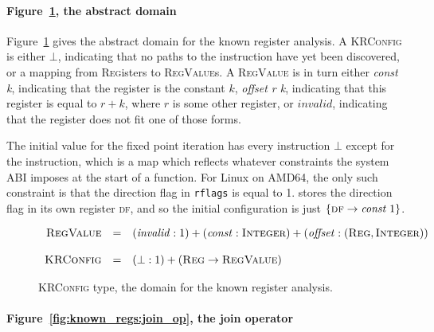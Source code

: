 
\paragraph{Figure~\ref{fig:known_regs:configuration}, the abstract domain}

Figure~\ref{fig:known_regs:configuration} gives the abstract domain
for the known register analysis.  A \textsc{KRConfig} is either
$\bot$, indicating that no paths to the instruction have yet been
discovered, or a mapping from \textsc{Reg}isters to
\textsc{RegValue}s.  A \textsc{RegValue} is in turn either
\textit{const k}, indicating that the register is the constant $k$,
\textit{offset r k}, indicating that this register is equal to $r +
k$, where $r$ is some other register, or $\mathit{invalid}$,
indicating that the register does not fit one of those forms.

The initial value for the fixed point iteration has every instruction
$\bot$ except for the  instruction, which is a
map which reflects whatever constraints the system ABI imposes at the
start of a function.  For Linux on AMD64, the only such constraint is
that the direction flag in \texttt{rflags} is equal to
1.  {\Implementation} stores the direction
flag in its own register \textsc{df}, and so the initial configuration
is just $\{ \textsc{df} \rightarrow \textit{const }1 \}$.

\begin{figure}
  \begin{displaymath}
    \begin{array}{rcl}
      \textsc{RegValue} & = & (\mathit{invalid}:1) + (\mathit{const}:\textsc{Integer}) + (\mathit{offset}:\left(\textsc{Reg}, \textsc{Integer}\right)) \\
      \\
      \textsc{KRConfig} & = & ({\bot}:1) + (\textsc{Reg} \rightarrow \textsc{RegValue})\\
    \end{array}
  \end{displaymath}
  \caption{\textsc{KRConfig} type, the domain for the known register
    analysis.}
  \label{fig:known_regs:configuration}
\end{figure}

\paragraph{Figure~\ref{fig:known_regs:join_op}, the join operator}

